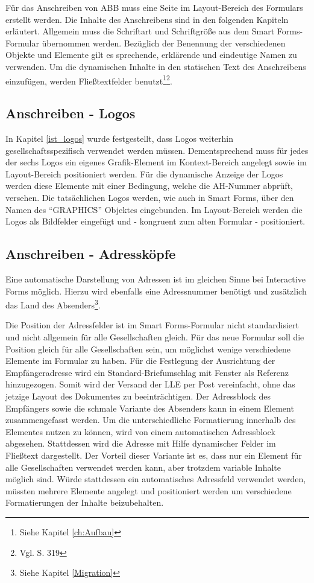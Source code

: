 Für das Anschreiben von ABB muss eine Seite im Layout-Bereich des Formulars erstellt werden. Die Inhalte des Anschreibens sind in den folgenden Kapiteln erläutert. Allgemein muss die Schriftart und Schriftgröße aus dem Smart Forms-Formular übernommen werden. Bezüglich der Benennung der verschiedenen Objekte und Elemente gilt es sprechende, erklärende und eindeutige Namen zu verwenden. Um die dynamischen Inhalte in den statischen Text des Anschreibens einzufügen, werden Fließtextfelder benutzt\footnote{Siehe Kapitel \ref{ch:Aufbau}}\footnote{Vgl. \cite{Hauser.2015} S. 319}.

\subsection{Anschreiben - Logos}

In Kapitel \ref{ist_logos} wurde festgestellt, dass Logos weiterhin gesellschaftsspezifisch verwendet werden müssen. Dementsprechend muss für jedes der sechs Logos ein eigenes Grafik-Element im Kontext-Bereich angelegt sowie im Layout-Bereich positioniert werden. Für die dynamische Anzeige der Logos werden diese Elemente mit einer Bedingung, welche die \ac{AH}-Nummer abprüft, versehen. Die tatsächlichen Logos werden, wie auch in Smart Forms, über den Namen des "`GRAPHICS"' Objektes eingebunden. Im Layout-Bereich werden die Logos als Bildfelder eingefügt und - kongruent zum alten Formular - positioniert. 

\subsection{Anschreiben - Adressköpfe}

Eine automatische Darstellung von Adressen ist im gleichen Sinne bei Interactive Forms möglich. Hierzu wird ebenfalls eine Adressnummer benötigt und zusätzlich das Land des Absenders\footnote{Siehe Kapitel \ref{Migration}}.

Die Position der Adressfelder ist im Smart Forms-Formular nicht standardisiert und nicht allgemein für alle Gesellschaften gleich. Für das neue Formular soll die Position gleich für alle Gesellschaften sein, um möglichst wenige verschiedene Elemente im Formular zu haben. Für die Festlegung der Ausrichtung der Empfängeradresse wird ein Standard-Briefumschlag mit Fenster als Referenz hinzugezogen. Somit wird der Versand der \ac{LLE} per Post vereinfacht, ohne das jetzige Layout des Dokumentes zu beeinträchtigen. Der Adressblock des Empfängers sowie die schmale Variante des Absenders kann in einem Element zusammengefasst werden. Um die unterschiedliche Formatierung innerhalb des Elementes nutzen zu können, wird von einem automatischen Adressblock abgesehen. Stattdessen wird die Adresse mit Hilfe dynamischer Felder im Fließtext dargestellt. Der Vorteil dieser Variante ist es, dass nur ein Element für alle Gesellschaften verwendet werden kann, aber trotzdem variable Inhalte möglich sind.
 Würde stattdessen ein automatisches Adressfeld verwendet werden, müssten mehrere Elemente angelegt und positioniert werden um verschiedene Formatierungen der Inhalte beizubehalten.
 
